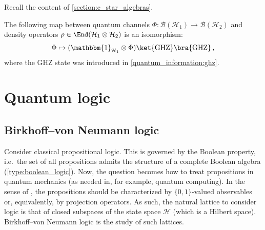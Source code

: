     Recall the content of \cref{section:c_star_algebras}.

    \begin{theorem}
        The following map between quantum channels $\Phi:\mathcal{B}(\mathcal{H}_1)\rightarrow\mathcal{B}(\mathcal{H}_2)$ and density operators $\rho\in\End(\mathcal{H}_1\otimes\mathcal{H}_2)$ is an isomorphism:
        \begin{gather}
            \Phi\mapsto(\mathbbm{1}_{\mathcal{H}_1}\otimes\Phi)\ket{\mathrm{GHZ}}\bra{\mathrm{GHZ}}\,,
        \end{gather}
        where the GHZ state was introduced in \cref{quantum_information:ghz}.
    \end{theorem}

\section{Quantum logic}\label{section:quantum_logic}
\subsection{Birkhoff--von Neumann logic}

    Consider classical propositional logic. This is governed by the Boolean property, i.e.~the set of all propositions admits the structure of a complete Boolean algebra (\cref{type:boolean_logic}). Now, the question becomes how to treat propositions in quantum mechanics (as needed in, for example, quantum computing). In the sense of , the propositions should be characterized by $\{0,1\}$-valued observables or, equivalently, by projection operators. As such, the natural lattice to consider logic is that of closed subspaces of the state space $\mathcal{H}$ (which is a Hilbert space). Birkhoff--von Neumann logic is the study of such lattices.

